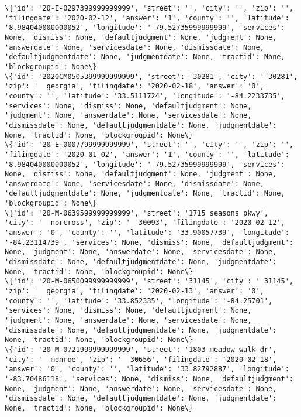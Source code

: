 \documentclass[11pt]{article}
\begin{document}
\begin{Verbatim}[commandchars=\\\{\}]
\{'id': '20-E-0297399999999999', 'street': '', 'city': '', 'zip': '', 'filingdate': '2020-02-12', 'answer': '1', 'county': '', 'latitude': '8.984040000000052', 'longitude': '-79.52735999999999', 'services': None, 'dismiss': None, 'defaultjudgment': None, 'judgment': None, 'answerdate': None, 'servicesdate': None, 'dismissdate': None, 'defaultjudgmentdate': None, 'judgmentdate': None, 'tractid': None, 'blockgroupid': None\}
\{'id': '2020CM0505399999999999', 'street': '30281', 'city': ' 30281', 'zip': '  georgia', 'filingdate': '2020-02-18', 'answer': '0', 'county': '', 'latitude': '33.5111724', 'longitude': '-84.2233735', 'services': None, 'dismiss': None, 'defaultjudgment': None, 'judgment': None, 'answerdate': None, 'servicesdate': None, 'dismissdate': None, 'defaultjudgmentdate': None, 'judgmentdate': None, 'tractid': None, 'blockgroupid': None\}
\{'id': '20-E-0007799999999999', 'street': '', 'city': '', 'zip': '', 'filingdate': '2020-01-02', 'answer': '1', 'county': '', 'latitude': '8.984040000000052', 'longitude': '-79.52735999999999', 'services': None, 'dismiss': None, 'defaultjudgment': None, 'judgment': None, 'answerdate': None, 'servicesdate': None, 'dismissdate': None, 'defaultjudgmentdate': None, 'judgmentdate': None, 'tractid': None, 'blockgroupid': None\}
\{'id': '20-M-0639599999999999', 'street': '1715 seasons pkwy', 'city': '  norcross', 'zip': '  30093', 'filingdate': '2020-02-12', 'answer': '0', 'county': '', 'latitude': '33.90057739', 'longitude': '-84.23114739', 'services': None, 'dismiss': None, 'defaultjudgment': None, 'judgment': None, 'answerdate': None, 'servicesdate': None, 'dismissdate': None, 'defaultjudgmentdate': None, 'judgmentdate': None, 'tractid': None, 'blockgroupid': None\}
\{'id': '20-M-0650099999999999', 'street': '31145', 'city': ' 31145', 'zip': '  georgia', 'filingdate': '2020-02-13', 'answer': '0', 'county': '', 'latitude': '33.852335', 'longitude': '-84.25701', 'services': None, 'dismiss': None, 'defaultjudgment': None, 'judgment': None, 'answerdate': None, 'servicesdate': None, 'dismissdate': None, 'defaultjudgmentdate': None, 'judgmentdate': None, 'tractid': None, 'blockgroupid': None\}
\{'id': '20-M-0721999999999999', 'street': '1803 meadow walk dr', 'city': '  monroe', 'zip': '  30656', 'filingdate': '2020-02-18', 'answer': '0', 'county': '', 'latitude': '33.82792887', 'longitude': '-83.70486118', 'services': None, 'dismiss': None, 'defaultjudgment': None, 'judgment': None, 'answerdate': None, 'servicesdate': None, 'dismissdate': None, 'defaultjudgmentdate': None, 'judgmentdate': None, 'tractid': None, 'blockgroupid': None\}

\end{Verbatim}
\end{document}
